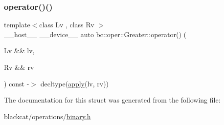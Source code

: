 \mbox{\label{structbc_1_1oper_1_1Greater_a4da11daf25c285a0bb900c20cc586f2d}} 
\subsubsection{\texorpdfstring{operator()()}{operator()()}}
{\footnotesize\ttfamily template$<$class Lv , class Rv $>$ \\
\+\_\+\+\_\+host\+\_\+\+\_\+ \+\_\+\+\_\+device\+\_\+\+\_\+ auto bc\+::oper\+::\+Greater\+::operator() (\begin{DoxyParamCaption}\item[{Lv \&\&}]{lv,  }\item[{Rv \&\&}]{rv }\end{DoxyParamCaption}) const -\/$>$ decltype(\hyperlink{structbc_1_1oper_1_1Greater_af110c0e66f662db92a4aa14e27b94876}{apply}(lv, rv)) \hspace{0.3cm}{\ttfamily [inline]}}



The documentation for this struct was generated from the following file\+:\begin{DoxyCompactItemize}
\item 
blackcat/operations/\hyperlink{binary_8h}{binary.\+h}\end{DoxyCompactItemize}
